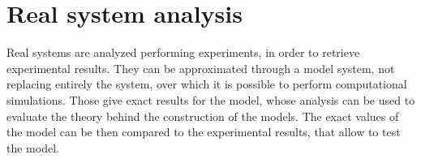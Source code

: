 \chapter{Real system analysis}

Real systems are analyzed performing experiments, in order to retrieve
experimental results.
They can be approximated through a model system, not replacing entirely the
system, over which it is possible to perform computational simulations. Those
give exact results for the model, whose analysis can be used to evaluate the
theory behind the construction of the models.
The exact values of the model can be then compared to the experimental results,
that allow to test the model.


